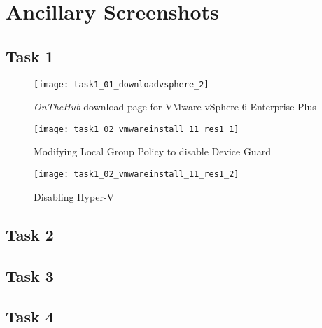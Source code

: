 \section{Ancillary Screenshots}
\label{app:ancillaryscreenshots}

\subsection{Task 1}

\begin{figure}[H]
  \centering
  \captionsetup{skip=2pt}
  \texttt{[image: task1\_01\_downloadvsphere\_2]}
  \caption{\textit{OnTheHub\textsuperscript{\textregistered}} download page for VMware vSphere 6 Enterprise Plus}
  \label{fig:task1:01_downloadvsphere}
\end{figure}

\begin{figure}[H]
  \centering
  \captionsetup{skip=2pt}
  \texttt{[image: task1\_02\_vmwareinstall\_11\_res1\_1]}
  \caption{Modifying Local Group Policy to disable Device Guard}
  \label{fig:task1:02_vmware_11_res1}
\end{figure}

\begin{figure}[H]
  \centering
  \captionsetup{skip=2pt}
  \texttt{[image: task1\_02\_vmwareinstall\_11\_res1\_2]}
  \caption{Disabling Hyper-V}
  \label{fig:task1:02_vmware_11_res2}
\end{figure}



\subsection{Task 2}

\subsection{Task 3}

\subsection{Task 4}

